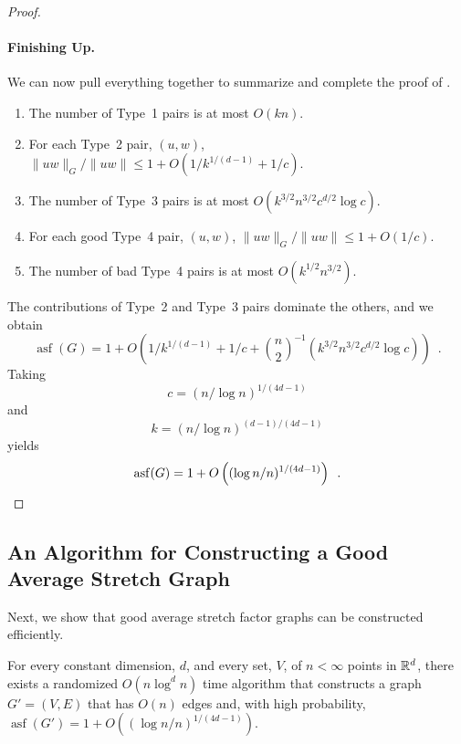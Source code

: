 \documentclass{patmorin}
\DeclareMathOperator{\asf}{asf}
\begin{document}
\begin{proof}
  \paragraph{Finishing Up.}
  We can now pull everything together to summarize and complete the proof
  of .
  \begin{enumerate}
    \item The number of Type~1 pairs is at most $O(kn)$.
    \item For each Type~2 pair, $(u,w)$, 
      $\|uw\|_G/\|uw\|\le 1+ O(1/k^{1/(d-1)}+1/c)$.
    \item The number of Type~3 pairs is at most
      $O(k^{3/2}n^{3/2}c^{d/2}\log c)$.
    \item For each good Type~4 pair, $(u,w)$, 
      $\|uw\|_G/\|uw\|\le 1+ O(1/c)$.
    \item The number of bad Type~4 pairs is at most 
       $O(k^{1/2}n^{3/2})$.
  \end{enumerate}
  The contributions of Type~2 and Type~3 pairs dominate the others, and
  we obtain
  \[
     \asf(G) = 1 + O\left(1/k^{1/(d-1)} + 1/c 
       + \binom{n}{2}^{-1}\left(k^{3/2}n^{3/2}c^{d/2}\log c\right)\right) \enspace .
  \]
  Taking 
  \[ 
       c = (n/\log n)^{1/(4d-1)}
  \]
  and
  \[
       k = (n/\log n)^{(d-1)/(4d-1)} 
  \]
  yields
  \[
     \asf(G) = 1+ O\left((\log n/n)^{1/(4d-1)}\right) \enspace . \qedhere
  \]
\end{proof}

\subsection{An Algorithm for Constructing a Good Average Stretch Graph}

Next, we show that good average stretch factor graphs can be constructed
efficiently.

\begin{thm}
  For every constant dimension, $d$, and every set, $V$, of $n<\infty$
  points in $\mathbb{R}^d$, there exists a randomized $O(n\log^{d} n )$ time
  algorithm that constructs a graph $G'=(V,E)$ that has $O(n)$ edges and,
  with high probability, $\asf(G')=1+O((\log n/n)^{1/(4d-1)})$.
\end{thm}
\end{document}
